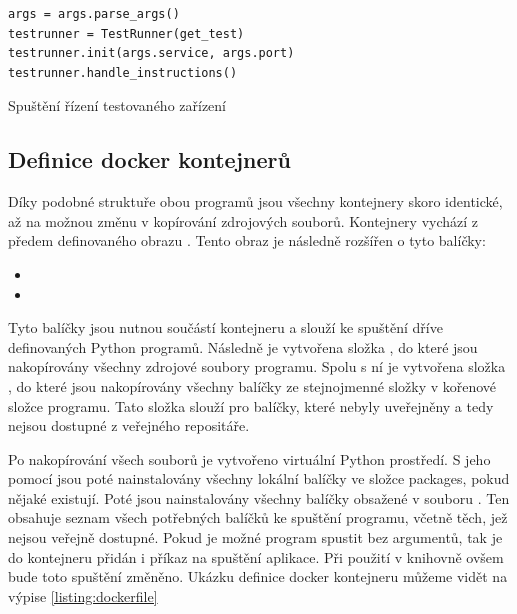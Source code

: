 \begin{listing}[htbp]
    \centering
    \begin{verbatim}
args = args.parse_args()
testrunner = TestRunner(get_test)
testrunner.init(args.service, args.port)
testrunner.handle_instructions()
    \end{verbatim}
\caption{Spuštění řízení testovaného zařízení}
\label{listing:server_main}
\end{listing}


\subsection{Definice docker kontejnerů}

Díky podobné struktuře obou programů jsou všechny kontejnery skoro identické, až na možnou změnu v kopírování zdrojových souborů. Kontejnery vychází z předem definovaného obrazu . Tento obraz je následně rozšířen o tyto balíčky:

\begin{itemize}
    \item {}
    \item {}
\end{itemize}

Tyto balíčky jsou nutnou součástí kontejneru a slouží ke spuštění dříve definovaných Python programů. Následně je vytvořena složka , do které jsou nakopírovány všechny zdrojové soubory programu. Spolu s ní je vytvořena složka , do které jsou nakopírovány všechny balíčky ze stejnojmenné složky v kořenové složce programu. Tato složka slouží pro balíčky, které nebyly uveřejněny a tedy nejsou dostupné z veřejného repositáře.

Po nakopírování všech souborů je vytvořeno virtuální Python prostředí. S jeho pomocí jsou poté nainstalovány všechny lokální balíčky ve složce packages, pokud nějaké existují. Poté jsou nainstalovány všechny balíčky obsažené v souboru . Ten obsahuje seznam všech potřebných balíčků ke spuštění programu, včetně těch, jež nejsou veřejně dostupné. Pokud je možné program spustit bez argumentů, tak je do kontejneru přidán i příkaz na spuštění aplikace. Při použití v knihovně ovšem bude toto spuštění změněno. Ukázku definice docker kontejneru můžeme vidět na výpise \ref{listing:dockerfile}

